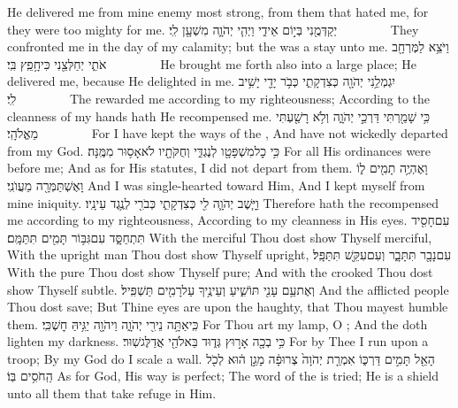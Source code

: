 {He delivered me from mine enemy most strong, from them that hated me, for they were too mighty for me.}
{יְקַדְּמֻ֖נִי בְּי֣וֹם אֵידִ֑י וַיְהִ֧י יְהֹוָ֛ה מִשְׁעָ֖ן לִֽי׃        }
{They confronted me in the day of my calamity; but the \lord\space was a stay unto me.}
{וַיֹּצֵ֥א לַמֶּרְחָ֖ב אֹתִ֑י יְחַלְּצֵ֖נִי כִּי\maqqaf חָ֥פֵֽץ בִּֽי׃        }
{He brought me forth also into a large place; He delivered me, because He delighted in me.}
{יִגְמְלֵ֥נִי יְהֹוָ֖ה כְּצִדְקָתִ֑י כְּבֹ֥ר יָדַ֖י יָשִׁ֥יב לִֽי׃        }
{The \lord\space rewarded me according to my righteousness; According to the cleanness of my hands hath He recompensed me.}
{כִּ֥י שָׁמַ֖רְתִּי דַּרְכֵ֣י יְהֹוָ֑ה וְלֹ֥א רָשַׁ֖עְתִּי מֵאֱלֹהָֽי׃        }
{For I have kept the ways of the \lord, And have not wickedly departed from my God.}
{כִּ֥י כׇל\maqqaf מִשְׁפָּטָ֖ו לְנֶגְדִּ֑י וְחֻקֹּתָ֖יו לֹא\maqqaf אָס֥וּר מִמֶּֽנָּה׃}
{For all His ordinances were before me; And as for His statutes, I did not depart from them.}
{וָאֶהְיֶ֥ה תָמִ֖ים ל֑וֹ וָאֶשְׁתַּמְּרָ֖ה מֵעֲוֺנִֽי׃}
{And I was single-hearted toward Him, And I kept myself from mine iniquity.}
{וַיָּ֧שֶׁב יְהֹוָ֛ה לִ֖י כְּצִדְקָתִ֑י כְּבֹרִ֖י לְנֶ֥גֶד עֵינָֽיו׃}
{Therefore hath the \lord\space recompensed me according to my righteousness, According to my cleanness in His eyes.}
{עִם\maqqaf חָסִ֖יד תִּתְחַסָּ֑ד עִם\maqqaf גִּבּ֥וֹר תָּמִ֖ים תִּתַּמָּֽם׃}
{With the merciful Thou dost show Thyself merciful, With the upright man Thou dost show Thyself upright,}
{עִם\maqqaf נָבָ֖ר תִּתָּבָ֑ר וְעִם\maqqaf עִקֵּ֖שׁ תִּתַּפָּֽל׃}
{With the pure Thou dost show Thyself pure; And with the crooked Thou dost show Thyself subtle.}
{וְאֶת\maqqaf עַ֥ם עָנִ֖י תּוֹשִׁ֑יעַ וְעֵינֶ֥יךָ עַל\maqqaf רָמִ֖ים תַּשְׁפִּֽיל׃}
{And the afflicted people Thou dost save; But Thine eyes are upon the haughty, that Thou mayest humble them.}
{כִּֽי\maqqaf אַתָּ֥ה נֵירִ֖י יְהֹוָ֑ה וַיהֹוָ֖ה יַגִּ֥יהַּ חׇשְׁכִּֽי׃}
{For Thou art my lamp, O \lord; And the \lord\space doth lighten my darkness.}
{כִּ֥י בְכָ֖ה אָר֣וּץ גְּד֑וּד בֵּאלֹהַ֖י אֲדַלֶּג\maqqaf שֽׁוּר׃}
{For by Thee I run upon a troop; By my God do I scale a wall.}
{הָאֵ֖ל תָּמִ֣ים דַּרְכּ֑וֹ אִמְרַ֤ת יְהֹוָה֙ צְרוּפָ֔ה מָגֵ֣ן ה֔וּא לְכֹ֖ל הַֽחֹסִ֥ים בּֽוֹ׃}
{As for God, His way is perfect; The word of the \lord\space is tried; He is a shield unto all them that take refuge in Him.}
